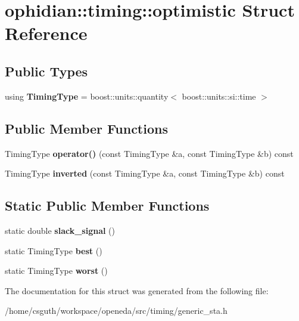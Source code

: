 \hypertarget{structophidian_1_1timing_1_1optimistic}{\section{ophidian\-:\-:timing\-:\-:optimistic Struct Reference}
\label{structophidian_1_1timing_1_1optimistic}
}
\subsection*{Public Types}
\begin{DoxyCompactItemize}
\item 
\hypertarget{structophidian_1_1timing_1_1optimistic_a20224456e3a1328f37724e5ad7d66f9c}{using {\bfseries Timing\-Type} = boost\-::units\-::quantity$<$ boost\-::units\-::si\-::time $>$}\label{structophidian_1_1timing_1_1optimistic_a20224456e3a1328f37724e5ad7d66f9c}

\end{DoxyCompactItemize}
\subsection*{Public Member Functions}
\begin{DoxyCompactItemize}
\item 
\hypertarget{structophidian_1_1timing_1_1optimistic_a37f4857a427814d852f1bfaa0261bafd}{Timing\-Type {\bfseries operator()} (const Timing\-Type \&a, const Timing\-Type \&b) const }\label{structophidian_1_1timing_1_1optimistic_a37f4857a427814d852f1bfaa0261bafd}

\item 
\hypertarget{structophidian_1_1timing_1_1optimistic_a70eaf65bacaa16ead50473c945afc56d}{Timing\-Type {\bfseries inverted} (const Timing\-Type \&a, const Timing\-Type \&b) const }\label{structophidian_1_1timing_1_1optimistic_a70eaf65bacaa16ead50473c945afc56d}

\end{DoxyCompactItemize}
\subsection*{Static Public Member Functions}
\begin{DoxyCompactItemize}
\item 
\hypertarget{structophidian_1_1timing_1_1optimistic_a5636c642a97902e5b87814e4a41f744d}{static double {\bfseries slack\-\_\-signal} ()}\label{structophidian_1_1timing_1_1optimistic_a5636c642a97902e5b87814e4a41f744d}

\item 
\hypertarget{structophidian_1_1timing_1_1optimistic_aacaa60fd86ccf0a20384cce8d6aeade3}{static Timing\-Type {\bfseries best} ()}\label{structophidian_1_1timing_1_1optimistic_aacaa60fd86ccf0a20384cce8d6aeade3}

\item 
\hypertarget{structophidian_1_1timing_1_1optimistic_ae8a2f5ec20a46a2dcc64d5792e968cb5}{static Timing\-Type {\bfseries worst} ()}\label{structophidian_1_1timing_1_1optimistic_ae8a2f5ec20a46a2dcc64d5792e968cb5}

\end{DoxyCompactItemize}


The documentation for this struct was generated from the following file\-:\begin{DoxyCompactItemize}
\item 
/home/csguth/workspace/openeda/src/timing/generic\-\_\-sta.\-h\end{DoxyCompactItemize}
